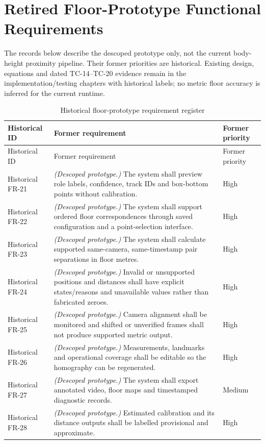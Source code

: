 \section{Retired Floor-Prototype Functional Requirements}
The records below describe the descoped prototype only, not the current body-height proximity pipeline. Their former priorities are historical. Existing design, equations and dated TC-14--TC-20 evidence remain in the implementation/testing chapters with historical labels; no metric floor accuracy is inferred for the current runtime.
\begin{longtable}{P{0.19\textwidth}P{0.59\textwidth}P{0.12\textwidth}}
\caption{Historical floor-prototype requirement register}\\
\toprule
Historical ID & Former requirement & Former priority\\
\midrule
\endfirsthead
\toprule
Historical ID & Former requirement & Former priority\\
\midrule
\endhead
Historical FR-21 & \textit{(Descoped prototype.)} The system shall preview role labels, confidence, track IDs and box-bottom points without calibration. & High\\
Historical FR-22 & \textit{(Descoped prototype.)} The system shall support ordered floor correspondences through saved configuration and a point-selection interface. & High\\
Historical FR-23 & \textit{(Descoped prototype.)} The system shall calculate supported same-camera, same-timestamp pair separations in floor metres. & High\\
Historical FR-24 & \textit{(Descoped prototype.)} Invalid or unsupported positions and distances shall have explicit states/reasons and unavailable values rather than fabricated zeroes. & High\\
Historical FR-25 & \textit{(Descoped prototype.)} Camera alignment shall be monitored and shifted or unverified frames shall not produce supported metric output. & High\\
Historical FR-26 & \textit{(Descoped prototype.)} Measurements, landmarks and operational coverage shall be editable so the homography can be regenerated. & High\\
Historical FR-27 & \textit{(Descoped prototype.)} The system shall export annotated video, floor maps and timestamped diagnostic records. & Medium\\
Historical FR-28 & \textit{(Descoped prototype.)} Estimated calibration and its distance outputs shall be labelled provisional and approximate. & High\\
\bottomrule
\end{longtable}

